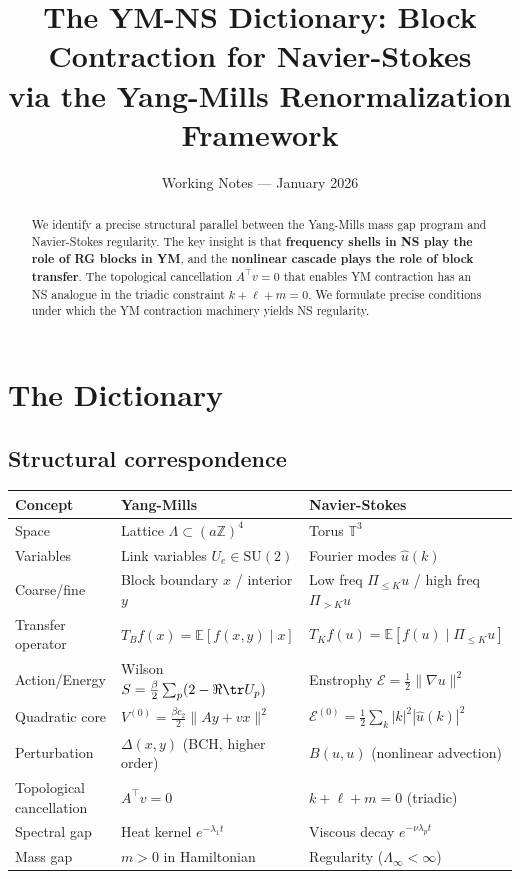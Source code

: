\documentclass[11pt]{article}
\title{The YM-NS Dictionary: Block Contraction for Navier-Stokes\\
via the Yang-Mills Renormalization Framework}
\author{Working Notes --- January 2026}
\date{}
\theoremstyle{definition}
\newcommand{\E}{\mathbb{E}}
\newcommand{\Z}{\mathbb{Z}}
\newcommand{\T}{\mathbb{T}}
\begin{document}
\maketitle

\begin{abstract}
We identify a precise structural parallel between the Yang-Mills mass gap program 
and Navier-Stokes regularity. The key insight is that \textbf{frequency shells in NS 
play the role of RG blocks in YM}, and the \textbf{nonlinear cascade plays the role 
of block transfer}. The topological cancellation $A^\top v = 0$ that enables YM 
contraction has an NS analogue in the triadic constraint $k + \ell + m = 0$. We 
formulate precise conditions under which the YM contraction machinery yields NS regularity.
\end{abstract}

\tableofcontents

\section{The Dictionary}

\subsection{Structural correspondence}

\begin{center}
\begin{tabular}{lll}
\toprule
\textbf{Concept} & \textbf{Yang-Mills} & \textbf{Navier-Stokes} \\
\midrule
Space & Lattice $\Lambda \subset (a\Z)^4$ & Torus $\T^3$ \\
Variables & Link variables $U_e \in \mathrm{SU}(2)$ & Fourier modes $\hat{u}(k)$ \\
Coarse/fine & Block boundary $x$ / interior $y$ & Low freq $\Pi_{\leq K}u$ / high freq $\Pi_{>K}u$ \\
Transfer operator & $T_B f(x) = \E[f(x,y) \mid x]$ & $T_K f(u) = \E[f(u) \mid \Pi_{\leq K}u]$ \\
Action/Energy & Wilson $S = \frac{\beta}{2}\sum_p(2-\Re\tr U_p)$ & Enstrophy $\mathcal{E} = \frac{1}{2}\|\nabla u\|^2$ \\
Quadratic core & $V^{(0)} = \frac{\beta c_2}{2}\|Ay + vx\|^2$ & $\mathcal{E}^{(0)} = \frac{1}{2}\sum_k |k|^2|\hat{u}(k)|^2$ \\
Perturbation & $\Delta(x,y)$ (BCH, higher order) & $B(u,u)$ (nonlinear advection) \\
Topological cancellation & $A^\top v = 0$ & $k + \ell + m = 0$ (triadic) \\
Spectral gap & Heat kernel $e^{-\lambda_1 t}$ & Viscous decay $e^{-\nu\lambda_p t}$ \\
Mass gap & $m > 0$ in Hamiltonian & Regularity ($\Lambda_\infty < \infty$) \\
\bottomrule
\end{tabular}
\end{center}
\end{document}
